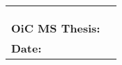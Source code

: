 \begin{table}[!ht]
\begin{adjustbox}{width=\linewidth,center}
\begin{tabular}{p{0.6cm}p{9cm}p{0.6cm}}
\multicolumn{2}{|l|}{}                                                                                                           &  \\ \cline{1-2}
\multicolumn{2}{|l|}{}                                                                                                           &  \\ \cline{1-2}
\multicolumn{2}{|l|}{}                                                                                                           &  \\ \cline{1-2}
\multicolumn{2}{l}{\textbf{OiC   MS Thesis:}}                                                                                    &  \\
\textbf{Date:} &                                                                                                                 & 
\end{tabular}
\end{adjustbox}
\end{table}